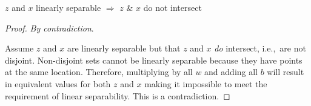 \begin{lemma}
  $z$ and $x$ linearly separable $\Rightarrow$ $z$ \& $x$ do not intersect
\end{lemma}

\begin{proof}
  \textit{By contradiction}.

  Assume $z$ and $x$ are linearly separable but that $z$ and $x$ \textit{do} intersect, i.e.,~are not disjoint.  Non-disjoint sets cannot be linearly separable because they have points at the same location.  Therefore, multiplying by all $w$ and adding all $b$ will result in equivalent values for both $z$ and $x$ making it impossible to meet the requirement of linear separability. This is a contradiction.
\end{proof}

